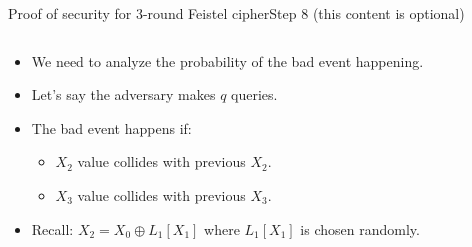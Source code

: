 \documentclass[aspectratio=169, lualatex, handout]{beamer}
\begin{document}
	\begin{frame}{Proof of security for 3-round Feistel cipher}{Step 8 (this content is optional)}
		\begin{columns}[c]
			\begin{column}{0.5\textwidth}
				\begin{itemize}
					\item We need to analyze the probability of the bad event happening.
					\item Let's say the adversary makes $q$ queries.
					\item The bad event happens if:
					      \begin{itemize}
						      \item $X_2$ value collides with previous $X_2$.
						      \item $X_3$ value collides with previous $X_3$.
					      \end{itemize}
					\item Recall: $X_2 = X_0 \oplus L_1[X_1]$ where $L_1[X_1]$ is chosen randomly.
				\end{itemize}
			\end{column}
			\begin{column}{0.5\textwidth}
				\vspace{-1.5cm}
				\begin{center}
				\end{center}
			\end{column}
		\end{columns}
	\end{frame}
\end{document}
